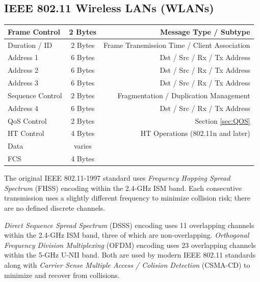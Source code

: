 \documentclass[12pt]{article}
\begin{document}
	\subsection{IEEE 802.11 Wireless LANs (WLANs) \label{subsec:802.11 WLANS}}
	\begin{table}[H]
	\centering
	\begin{tabular}{| l | c | r |}
	\hline
	Frame Control		& 2 Bytes	& Message Type / Subtype\\\hline
	Duration / ID		& 2 Bytes	& Frame Transmission Time / Client Association\\\hline
	Address 1			& 6 Bytes	& Dst / Src / Rx / Tx Address\\\hline
	Address 2			& 6 Bytes	& Dst / Src / Rx / Tx Address\\\hline
	Address 3			& 6 Bytes	& Dst / Src / Rx / Tx Address\\\hline
	Sequence Control		& 2 Bytes	& Fragmentation / Duplication Management\\\hline
	Address 4			& 6 Bytes	& Dst / Src / Rx / Tx Address\\\hline
	QoS Control		& 2 Bytes	& Section \ref{sec:QOS}\\\hline
	HT Control			& 4 Bytes	& HT Operations (802.11n and later)\\\hline
	Data				& varies	&\\\hline
	FCS				& 4 Bytes	&\\\hline
	\end{tabular}\end{table}
	The original IEEE 802.11-1997 standard uses \textit{Frequency Hopping Spread Spectrum} (FHSS) encoding within the 2.4-GHz ISM band. Each consecutive transmission uses a slightly different frequency to minimize collision risk; there are no defined discrete channels.
	
	\textit{Direct Sequence Spread Spectrum} (DSSS) encoding uses 11 overlapping channels within the 2.4-GHz ISM band, three of which are non-overlapping. \textit{Orthogonal Frequency Division Multiplexing} (OFDM) encoding uses 23 overlapping channels within the 5-GHz U-NII band. Both are used by modern IEEE 802.11 standards along with \textit{Carrier Sense Multiple Access / Colision Detection} (CSMA-CD) to minimize and recover from collisions.
\end{document}

